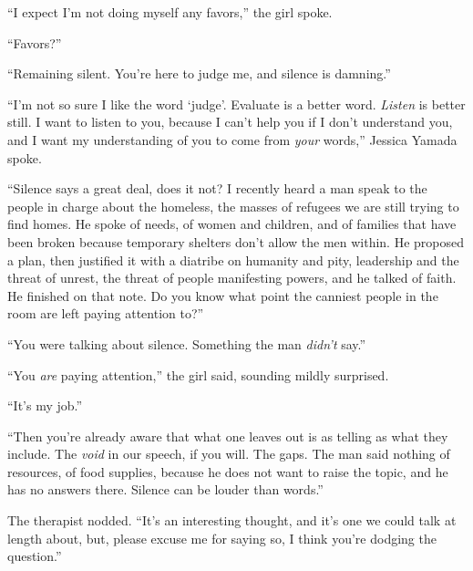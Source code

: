 





``I expect I'm not doing myself any favors,'' the girl spoke.



``Favors?''



``Remaining silent.  You're here to judge me, and silence is damning.''



``I'm not so sure I like the word `judge'.  Evaluate is a better word.  \emph{Listen} is better still.  I want to listen to you, because I can't help you if I don't understand you, and I want my understanding of you to come from \emph{your} words,'' Jessica Yamada spoke.



``Silence says a great deal, does it not?  I recently heard a man speak to the people in charge about the homeless, the masses of refugees we are still trying to find homes.  He spoke of needs, of women and children, and of families that have been broken because temporary shelters don't allow the men within.  He proposed a plan, then justified it with a diatribe on humanity and pity, leadership and the threat of unrest, the threat of people manifesting powers, and he talked of faith.  He finished on that note.  Do you know what point the canniest people in the room are left paying attention to?''



``You were talking about silence.  Something the man \emph{didn't} say.''



``You \emph{are} paying attention,'' the girl said, sounding mildly surprised.



``It's my job.''



``Then you're already aware that what one leaves out is as telling as what they include.  The \emph{void} in our speech, if you will.  The gaps.  The man said nothing of resources, of food supplies, because he does not want to raise the topic, and he has no answers there.  Silence can be louder than words.''



The therapist nodded.  ``It's an interesting thought, and it's one we could talk at length about, but, please excuse me for saying so, I think you're dodging the question.''



